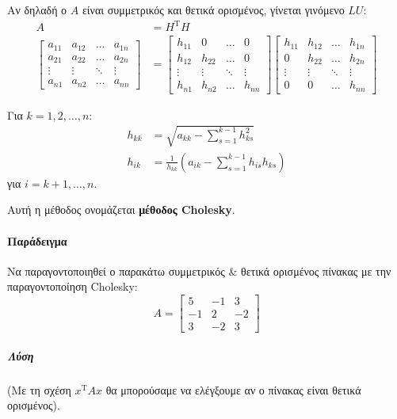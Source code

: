 \documentclass[11pt,a4paper,notitlepage,fleqn]{article}
\begin{document}
Αν δηλαδή ο \( A \) είναι συμμετρικός και θετικά ορισμένος,
γίνεται γινόμενο \( LU \):
\begin{align*}
	A &= H^{\mathrm T}H \\
	\left[\begin{matrix}
	a_{11}&a_{12}&\hdots&a_{1n} \\
	a_{21}&a_{22}&\hdots&a_{2n}\\
	\vdots&\vdots&\ddots&\vdots\\
	a_{n1}&a_{n2}&\hdots&a_{nn}
	\end{matrix}\right] &= \left[\begin{matrix}
	h_{11}&0&\hdots&0\\
	h_{12}&h_{22}&\hdots&0\\
	\vdots&\vdots&\ddots&\vdots\\
	h_{n1}&h_{n2}&\hdots&h_{nn}
	\end{matrix}\right]\left[\begin{matrix}
	h_{11}&h_{12}&\hdots&h_{1n}\\
	0&h_{22}&\hdots&h_{2n}\\
	\vdots & \vdots & \ddots & \vdots \\
	0 & 0 & \hdots & h_{nn}
	\end{matrix}\right]
\end{align*}

Για \( k=1,2,\dots,n \):
\begin{align*}
	h_{kk} &= \sqrt{a_{kk}-\sum_{s=1}^{k-1} h_{ks}^2 }\\
	h_{ik} &= \frac{1}{h_{kk}}\left(a_{ik}-\sum_{s=1}^{k-1}
h_{is}h_{ks}\right)
\end{align*}
για \( i=k+1,\dots,n \).

Αυτή η μέθοδος ονομάζεται \textbf{μέθοδος Cholesky}.

\paragraph{Παράδειγμα}
Να παραγοντοποιηθεί ο παρακάτω συμμετρικός \& θετικά ορισμένος
πίνακας με την παραγοντοποίηση Cholesky:
\[
A = \left[\begin{matrix}
5&-1&3\\-1&2&-2\\3&-2&3
\end{matrix}\right]
\]
\subparagraph{Λύση}
(Με τη σχέση \( x^{\mathrm T}Ax \) θα μπορούσαμε να ελέγξουμε αν
ο πίνακας είναι θετικά ορισμένος).
\end{document}
